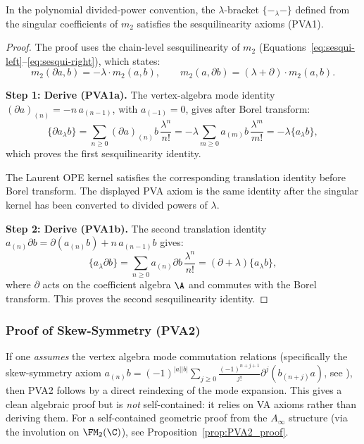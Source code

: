 \begin{lemma}
In the polynomial divided-power convention, the $\lambda$-bracket
\(\{-_\lambda-\}\) defined from the singular coefficients of \(m_2\)
satisfies the sesquilinearity axioms (PVA1).
\end{lemma}

\begin{proof}
The proof uses the chain-level sesquilinearity of $m_2$ (Equations~\eqref{eq:sesqui-left}--\eqref{eq:sesqui-right}), which states:
\[
m_2(\partial a, b) = -\lambda \cdot m_2(a, b), \qquad m_2(a, \partial b) = (\lambda + \partial) \cdot m_2(a,b).
\]

\textbf{Step 1: Derive (PVA1a).} The vertex-algebra mode identity
\((\partial a)_{(n)}=-n\,a_{(n-1)}\), with \(a_{(-1)}=0\), gives after
Borel transform:
\[
\{\partial a_\lambda b\}
=\sum_{n\ge0}(\partial a)_{(n)}b\,\frac{\lambda^n}{n!}
=-\lambda\sum_{m\ge0}a_{(m)}b\,\frac{\lambda^m}{m!}
=-\lambda\{a_\lambda b\},
\]
which proves the first sesquilinearity identity.

\begin{remark}
The Laurent OPE kernel satisfies the corresponding translation identity
before Borel transform. The displayed PVA axiom is the same identity
after the singular kernel has been converted to divided powers of
\(\lambda\).
\end{remark}

\textbf{Step 2: Derive (PVA1b).} The second translation identity
\(a_{(n)}\partial b=\partial(a_{(n)}b)+n\,a_{(n-1)}b\) gives:
\[
\{a_\lambda \partial b\}
=\sum_{n\ge0}a_{(n)}\partial b\,\frac{\lambda^n}{n!}
=(\partial+\lambda)\{a_\lambda b\},
\]
where $\partial$ acts on the coefficient algebra $\A$ and commutes with
the Borel transform. This proves the second sesquilinearity identity.
\end{proof}

\subsubsection{Proof of Skew-Symmetry (PVA2)}

\begin{remark}
If one \emph{assumes} the vertex algebra mode commutation relations
(specifically the skew-symmetry axiom $a_{(n)} b = (-1)^{|a||b|}
\sum_{j \geq 0} \frac{(-1)^{n+j+1}}{j!} \partial^j(b_{(n+j)} a)$, see
\cite[Theorem~3.3.2]{Kac98}), then PVA2 follows by a direct reindexing
of the mode expansion. This gives a clean algebraic proof but is
\emph{not} self-contained: it relies on VA axioms rather than deriving
them. For a self-contained geometric proof from the $A_\infty$ structure
(via the involution on $\FM_2(\C)$), see Proposition~\ref{prop:PVA2_proof}.
\end{remark}

